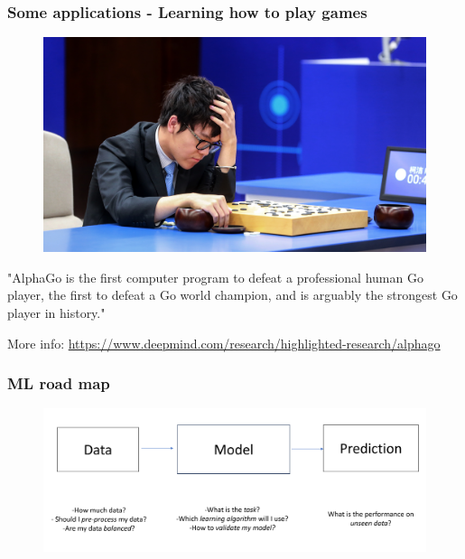 \documentclass{beamer}
\begin{document}
	\begin{frame}
		\frametitle{Some applications - Learning how to play games}
		\begin{figure}
			\centering
			\includegraphics[scale=0.3]{images/alphago}
		\end{figure}
	"AlphaGo is the first computer program to defeat a professional human Go player, the first to defeat a Go world champion, and is arguably the strongest Go player in history." 
	
	More info: \href{https://www.deepmind.com/research/highlighted-research/alphago}{https://www.deepmind.com/research/highlighted-research/alphago}
	\end{frame}

	\begin{frame}
		\frametitle{ML road map}
		\begin{figure}
			\centering
			\includegraphics[scale=0.4]{images/road-map}
		\end{figure}
	\end{frame}
\end{document}
